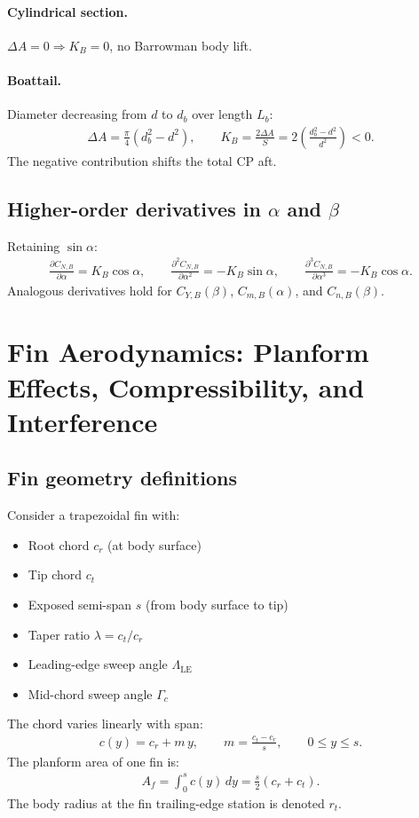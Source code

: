 \documentclass[11pt]{article}
\begin{document}
\paragraph{Cylindrical section.}
$\Delta A=0 \Rightarrow K_B=0$, no Barrowman body lift.

\paragraph{Boattail.}
Diameter decreasing from $d$ to $d_b$ over length $L_b$:
\begin{align}
\Delta A = \frac{\pi}{4}(d_b^2-d^2),\qquad
K_B = \frac{2\Delta A}{S} = 2\left(\frac{d_b^2-d^2}{d^2}\right) <0.
\end{align}
The negative contribution shifts the total CP aft.

\subsection{Higher-order derivatives in $\alpha$ and $\beta$}
Retaining $\sin\alpha$:
\begin{align}
\frac{\partial C_{N,B}}{\partial\alpha} = K_B\cos\alpha,\qquad
\frac{\partial^2 C_{N,B}}{\partial\alpha^2} = -K_B\sin\alpha,\qquad
\frac{\partial^3 C_{N,B}}{\partial\alpha^3} = -K_B\cos\alpha.
\end{align}
Analogous derivatives hold for $C_{Y,B}(\beta)$, $C_{m,B}(\alpha)$, and $C_{n,B}(\beta)$.

\section{Fin Aerodynamics: Planform Effects, Compressibility, and Interference}

\subsection{Fin geometry definitions}
Consider a trapezoidal fin with:
\begin{itemize}[leftmargin=2em]
\item Root chord $c_r$ (at body surface)
\item Tip chord $c_t$
\item Exposed semi-span $s$ (from body surface to tip)
\item Taper ratio $\lambda = c_t/c_r$
\item Leading-edge sweep angle $\Lambda_{\text{LE}}$
\item Mid-chord sweep angle $\Gamma_c$
\end{itemize}
The chord varies linearly with span:
\begin{align}
c(y) = c_r + m\,y,\qquad m = \frac{c_t-c_r}{s},\qquad 0\le y\le s.
\end{align}
The planform area of one fin is:
\begin{align}
A_f = \int_0^s c(y)\,dy = \frac{s}{2}(c_r+c_t).
\end{align}
The body radius at the fin trailing-edge station is denoted $r_t$.
\end{document}
